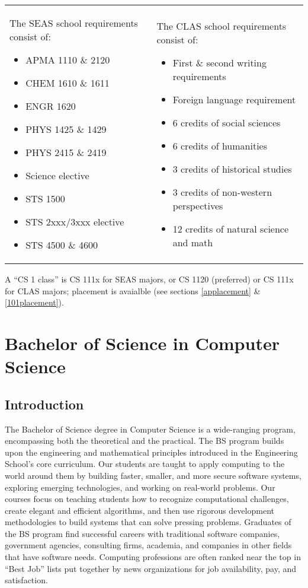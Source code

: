 \documentclass[10pt,letter]{book}
\newenvironment{itemlist}{
\begin{itemize}
\setlength{\itemsep}{0pt}
\setlength{\parskip}{0pt}}
{\end{itemize}}
\newcommand{\mychapter}[2]{\chapter{#1}\renewcommand{\leftmark}{\textsc{#2}}}
\newcommand{\mysection}[1]{\section{#1}\renewcommand{\rightmark}{#1}}
\begin{document}
\noindent
\begin{tabular}{p{2in}p{2.25in}}

The SEAS school requirements consist of:
\begin{itemlist}
\item APMA 1110 \& 2120
\item CHEM 1610 \& 1611
\item ENGR 1620
\item PHYS 1425 \& 1429
\item PHYS 2415 \& 2419
\item Science elective
\item STS 1500
\item STS 2xxx/3xxx elective
\item STS 4500 \& 4600
\end{itemlist}

&

The CLAS school requirements consist of:
\begin{itemlist}
\item First \& second writing requirements
\item Foreign language requirement
\item 6 credits of social sciences
\item 6 credits of humanities
\item 3 credits of historical studies
\item 3 credits of non-western perspectives
\item 12 credits of natural science and math
\end{itemlist}

\end{tabular}

\noindent A ``CS 1 class'' is CS 111x for SEAS majors, or CS 1120
(preferred) or CS 111x for CLAS majors; placement is avaialble (see
sections \ref{applacement} \& \ref{101placement}).

\clearpage
\mychapter{Bachelor of Science in Computer Science}{BS CS Degree}


\mysection{Introduction}


The Bachelor of Science degree in Computer Science is a wide-ranging
program, encompassing both the theoretical and the practical.  The BS
program builds upon the engineering and mathematical principles
introduced in the Engineering School's core curriculum.  Our students
are taught to apply computing to the world around them by building
faster, smaller, and more secure software systems, exploring emerging
technologies, and working on real-world problems.  Our courses focus
on teaching students how to recognize computational challenges, create
elegant and efficient algorithms, and then use rigorous development
methodologies to build systems that can solve pressing
problems. Graduates of the BS program find successful careers with
traditional software companies, government agencies, consulting firms,
academia, and companies in other fields that have software needs.
Computing professions are often ranked near the top in ``Best Job''
lists put together by news organizations for job availability, pay,
and satisfaction.
\end{document}
